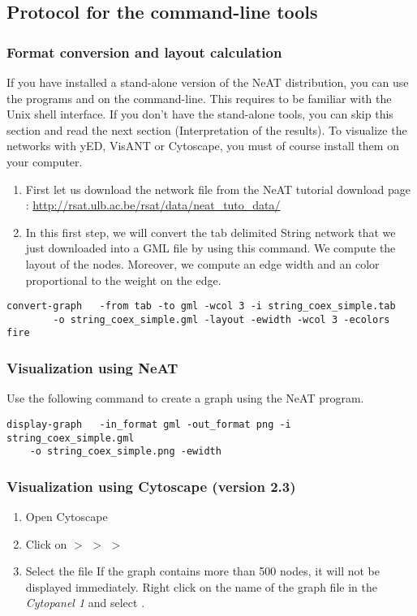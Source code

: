 \subsection{Protocol for the command-line tools}
\subsubsection{Format conversion and layout calculation}
If you have installed a stand-alone version of the NeAT distribution,
you can use the programs  and  on the
command-line. This requires to be familiar with the Unix shell
interface. If you don't have the stand-alone tools, you can skip this
section and read the next section (Interpretation of the results). To visualize the networks with yED, VisANT or Cytoscape, you
must of course install them on your computer.


\begin{enumerate}
\item First let us download the network file  from the NeAT tutorial download page : \url{http://rsat.ulb.ac.be/rsat/data/neat\_tuto\_data/} 
\item In this first step, we will convert the tab delimited String network that we just downloaded into a GML file by using this command. We compute the layout of the nodes. Moreover, we compute an edge width and an color proportional to the weight on the edge.

\end{enumerate}

\lstset{language=csh}
\begin{lstlisting}
convert-graph 	-from tab -to gml -wcol 3 -i string_coex_simple.tab 
		-o string_coex_simple.gml -layout -ewidth -wcol 3 -ecolors fire
\end{lstlisting}

\subsubsection{Visualization using NeAT}
Use the following command to create a graph using the NeAT  program.
\begin{lstlisting}
display-graph 	-in_format gml -out_format png -i string_coex_simple.gml
	-o string_coex_simple.png -ewidth
\end{lstlisting}


\subsubsection{Visualization using Cytoscape (version 2.3)}
\begin{enumerate}
 \item Open Cytoscape
 \item Click on  $>$   $>$  $>$  
 \item Select the file 
If the graph contains more than 500 nodes, it will not be displayed immediately. Right click on the name of the graph file in the \textit{Cytopanel 1} and select .
\end{enumerate}

